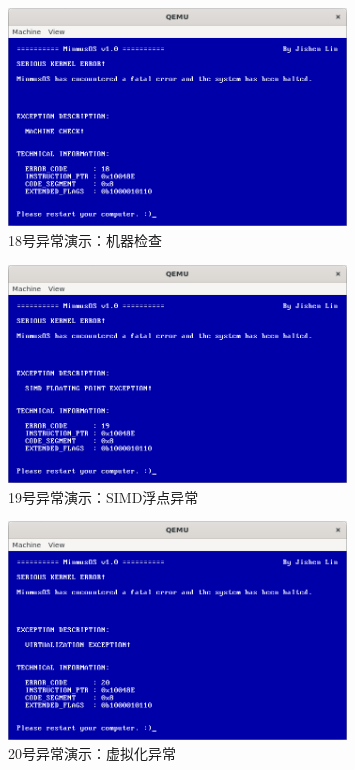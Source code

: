 \begin{figure}[htbp]
    \centering
    \includegraphics[width=0.8\textwidth]{figures/Exception18Presentation.png}
    \caption{18号异常演示：机器检查}
\end{figure}

\begin{figure}[htbp]
    \centering
    \includegraphics[width=0.8\textwidth]{figures/Exception19Presentation.png}
    \caption{19号异常演示：SIMD浮点异常}
\end{figure}

\begin{figure}[htbp]
    \centering
    \includegraphics[width=0.8\textwidth]{figures/Exception20Presentation.png}
    \caption{20号异常演示：虚拟化异常}
\end{figure}

